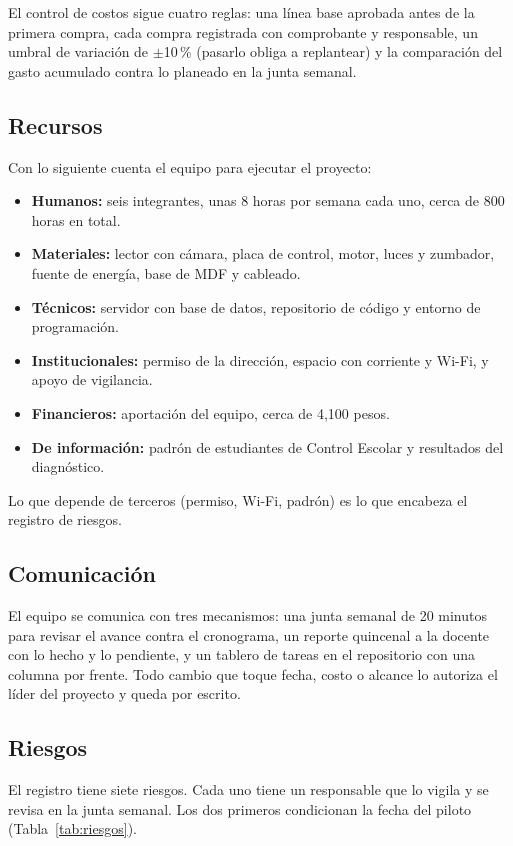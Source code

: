 El control de costos sigue cuatro reglas: una línea base aprobada antes de la
primera compra, cada compra registrada con comprobante y responsable, un umbral
de variación de $\pm$10\,\% (pasarlo obliga a replantear) y la comparación del
gasto acumulado contra lo planeado en la junta semanal.

\subsection{Recursos}
Con lo siguiente cuenta el equipo para ejecutar el proyecto:
\begin{itemize}
	\item \textbf{Humanos:} seis integrantes, unas 8 horas por semana cada uno,
	      cerca de 800 horas en total.
	\item \textbf{Materiales:} lector con cámara, placa de control, motor, luces
	      y zumbador, fuente de energía, base de MDF y cableado.
	\item \textbf{Técnicos:} servidor con base de datos, repositorio de código y
	      entorno de programación.
	\item \textbf{Institucionales:} permiso de la dirección, espacio con
	      corriente y Wi-Fi, y apoyo de vigilancia.
	\item \textbf{Financieros:} aportación del equipo, cerca de 4,100 pesos.
	\item \textbf{De información:} padrón de estudiantes de Control Escolar y
	      resultados del diagnóstico.
\end{itemize}
Lo que depende de terceros (permiso, Wi-Fi, padrón) es lo que encabeza el
registro de riesgos.

\subsection{Comunicación}
El equipo se comunica con tres mecanismos: una junta semanal de 20 minutos
para revisar el avance contra el cronograma, un reporte quincenal a la
docente con lo hecho y lo pendiente, y un tablero de tareas en el repositorio
con una columna por frente. Todo cambio que toque fecha, costo o alcance lo
autoriza el líder del proyecto y queda por escrito.

\subsection{Riesgos}
\label{sec:riesgos}
El registro tiene siete riesgos. Cada uno tiene un responsable que lo vigila
y se revisa en la junta semanal. Los dos primeros condicionan la fecha del
piloto (Tabla~\ref{tab:riesgos}).

